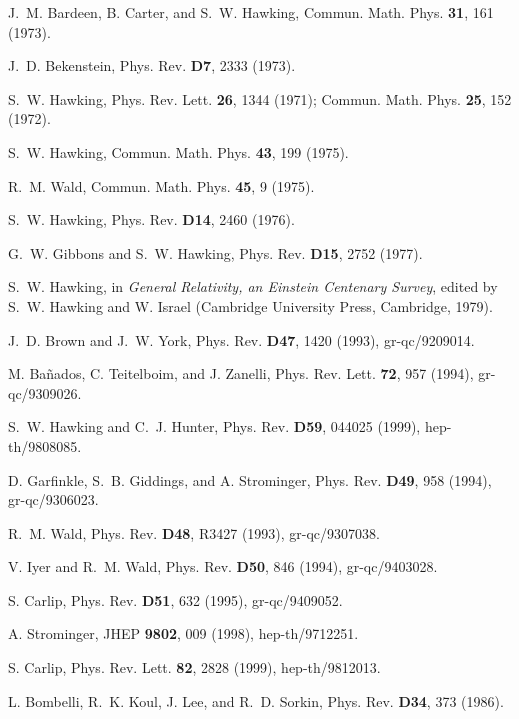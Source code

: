 \documentclass[12pt,epsf]{article}
\begin{document}
\begin{thebibliography}{10}

J.~M. Bardeen, B. Carter, and S.~W. Hawking, Commun. Math. Phys. {\bf 31},  161
   (1973).

J.~D. Bekenstein, Phys. Rev. {\bf D7},  2333  (1973).

S.~W. Hawking, Phys. Rev. Lett. {\bf 26},  1344  (1971);
Commun. Math. Phys. {\bf 25},  152  (1972).

S.~W. Hawking, Commun. Math. Phys. {\bf 43},  199  (1975).

R.~M. Wald, Commun. Math. Phys. {\bf 45},  9  (1975).

S.~W. Hawking, Phys. Rev. {\bf D14},  2460  (1976).

G.~W. Gibbons and S.~W. Hawking, Phys. Rev. {\bf D15},  2752  (1977).

S.~W. Hawking,  in {\em General Relativity, an {E}instein Centenary Survey},
  edited by S.~W. Hawking and W. Israel (Cambridge University Press, Cambridge,
  1979).

J.~D. Brown and J.~W. York, Phys. Rev. {\bf D47},  1420  (1993), gr-qc/9209014.

M. Ba{\~n}ados, C. Teitelboim, and J. Zanelli, Phys. Rev. Lett. {\bf 72},  957
  (1994), gr-qc/9309026.

S.~W. Hawking and C.~J. Hunter, Phys. Rev. {\bf D59},  044025  (1999),
  hep-th/9808085.

D. Garfinkle, S.~B. Giddings, and A. Strominger, Phys. Rev. {\bf D49},  958
  (1994), gr-qc/9306023.

R.~M. Wald, Phys. Rev. {\bf D48},  R3427  (1993), gr-qc/9307038.

V. Iyer and R.~M. Wald, Phys. Rev. {\bf D50},  846  (1994), gr-qc/9403028.

S. Carlip, Phys. Rev. {\bf D51},  632  (1995), gr-qc/9409052.

A. Strominger, JHEP {\bf 9802},  009  (1998), hep-th/9712251.

S. Carlip, Phys. Rev. Lett. {\bf 82},  2828  (1999), hep-th/9812013.

L. Bombelli, R.~K. Koul, J. Lee, and R.~D. Sorkin, Phys. Rev. {\bf D34},  373
  (1986).


\end{thebibliography}
\end{document}
